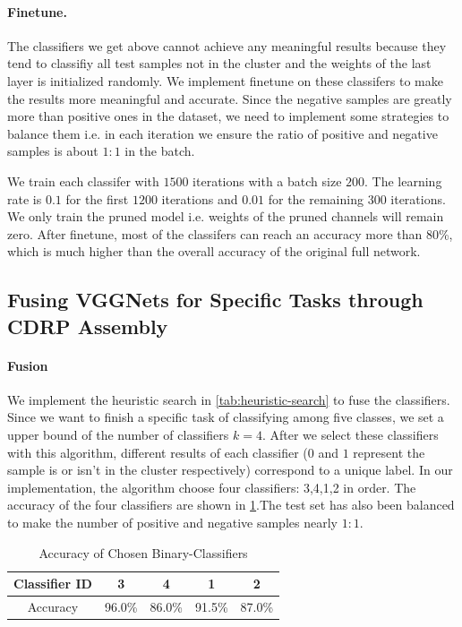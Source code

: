 \documentclass[sigplan,10pt,review]{acmart}\settopmatter{printfolios=true,printccs=false,printacmref=false}
\begin{document}
\paragraph{Finetune.} The classifiers we get above cannot achieve any meaningful results because they tend to classifiy all test samples not in the cluster and the weights of the last layer is initialized randomly.
We implement finetune on these classifers to make the results more meaningful and accurate. 
Since the negative samples are greatly more than positive ones in the dataset, we need to implement some strategies to balance them i.e. in each iteration we ensure the ratio of positive and negative samples is about $1:1$ in the batch.

We train each classifer with $1500$ iterations with a batch size $200$. 
The learning rate is $0.1$ for the first $1200$ iterations and $0.01$ for the remaining $300$ iterations. 
We only train the pruned model i.e. weights of the pruned channels will remain zero.
After finetune, most of the classifers can reach an accuracy more than 80\%, which is much higher than the overall accuracy of the original full network.
 

 
\subsection{Fusing VGGNets for Specific Tasks through CDRP Assembly}
\paragraph{Fusion} We implement the heuristic search in \cref{tab:heuristic-search} to fuse the classifiers. 
Since we want to finish a specific task of classifying among five classes, we set a upper bound of the number of classifiers $k=4$. 
After we select these classifiers with this algorithm, different results of each classifier ($0$ and $1$ represent the sample is or isn't in the cluster respectively) correspond to a unique label.
In our implementation, the algorithm choose four classifiers: 3,4,1,2 in order. 
The accuracy of the four classifiers are shown in \cref{tab:classifer-accuracy}.The test set has also been balanced to make the number of positive and negative samples nearly $1:1$. 

\begin{table}[h]
    \caption{Accuracy of Chosen Binary-Classifiers}
    \label{tab:classifer-accuracy}
	\begin{tabular}{|c|c|c|c|c|}
	\hline
	Classifier ID & 3 & 4 & 1 & 2 \\
	\hline
	Accuracy & 96.0\% & 86.0\% & 91.5\% & 87.0\%\\
	\hline
	\end{tabular}
\end{table}
\end{document}
